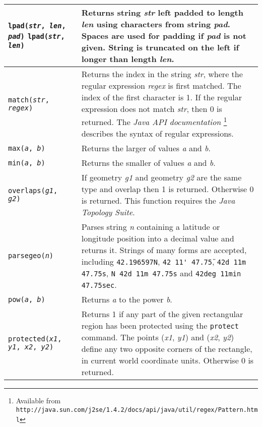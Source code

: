 \begin{longtable}{|p{5cm}|p{7cm}|}
\hline

\texttt{lpad(\textit{str}, \textit{len}, \textit{pad})}
\texttt{lpad(\textit{str}, \textit{len})} &
Returns string \textit{str} left padded to length \textit{len}
using characters from string \textit{pad}.
Spaces are used for padding if \textit{pad} is not given.
String is truncated on the left if longer than length \textit{len}. \\

\hline

\texttt{match(\textit{str}, \textit{regex})} &
Returns the index in the string \textit{str}, where the regular expression
\textit{regex} is first matched.  The index of the first character is 1.
If the regular expression does not match \textit{str}, then 0 is returned.
The \textit{Java API documentation}
\footnote{Available from
\texttt{http://java.sun.com/j2se/1.4.2/docs/api/java/util/regex/Pattern.html}}
describes the syntax of regular expressions. \\

\hline

\texttt{max(\textit{a}, \textit{b})} &
Returns the larger of values \textit{a} and \textit{b}. \\

\hline

\texttt{min(\textit{a}, \textit{b})} &
Returns the smaller of values \textit{a} and \textit{b}. \\

\hline

\texttt{overlaps(\textit{g1}, \textit{g2})} &
If geometry \textit{g1} and geometry \textit{g2}
are the same type
and overlap
then 1 is returned.  Otherwise 0 is returned.
This function requires the \textit{Java Topology Suite}. \\

\hline

\texttt{parsegeo(\textit{n})} &
Parses string \textit{n} containing a latitude or longitude position
into a decimal value and returns it.  Strings of many forms are
accepted, including
\texttt{42.196597N}, \texttt{42\textdegree{} 11\'{} 47.75\"},
\texttt{42d 11m 47.75s},
\texttt{N 42d 11m 47.75s} and
\texttt{42deg 11min 47.75sec}. \\

\hline

\texttt{pow(\textit{a}, \textit{b})} &
Returns \textit{a} to the power \textit{b}. \\

\hline

\texttt{protected(\textit{x1}, \textit{y1}, \textit{x2}, \textit{y2})} &
Returns 1 if any part of the given rectangular region
has been protected using the \texttt{protect}
command.
The points
(\textit{x1}, \textit{y1}) and (\textit{x2}, \textit{y2}) define
any two opposite corners of the rectangle, in current world coordinate
units.
Otherwise 0 is returned. \\


\end{longtable}
